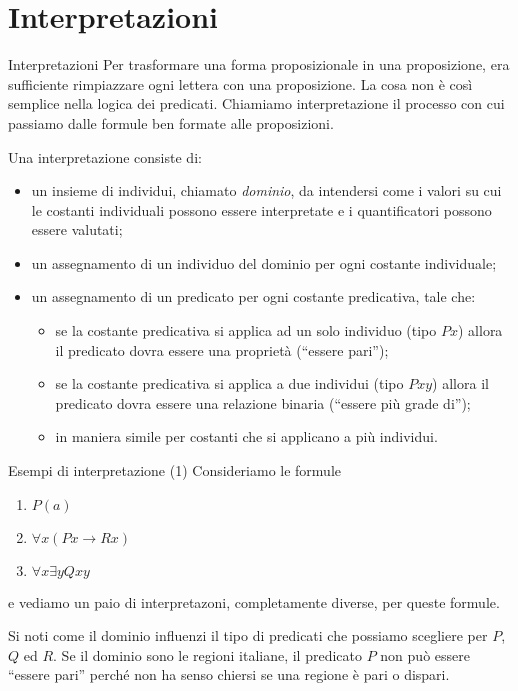 \documentclass[10pt,dvipsnames,xcolor=table,handout]{beamer}
\begin{document}
\section{Interpretazioni}

\begin{frame}{Interpretazioni}
    Per trasformare una forma proposizionale in una proposizione, era sufficiente rimpiazzare ogni lettera con una proposizione. La cosa non è così semplice nella logica dei predicati. Chiamiamo \alert{interpretazione} il processo con cui passiamo dalle formule ben formate alle proposizioni.

    \begin{definition}
        Una \alert{interpretazione} consiste di:
        \begin{itemize}
            \item un insieme di individui, chiamato \emph{dominio}, da intendersi come i valori su cui le costanti individuali possono essere interpretate e i quantificatori possono essere valutati;
            \item un assegnamento di un individuo del dominio per ogni costante individuale;
            \item un assegnamento di un predicato per ogni costante predicativa, tale che:
                  \begin{itemize}
                      \item se la costante predicativa si applica ad un solo individuo (tipo $Px$) allora il predicato dovra essere una proprietà (``essere pari'');
                      \item se la costante predicativa si applica a due individui (tipo $Pxy$) allora il predicato dovra essere una relazione binaria (``essere più grade di'');
                      \item in maniera simile per costanti che si applicano a più individui.
                  \end{itemize}
        \end{itemize}
    \end{definition}
\end{frame}

\begin{frame}{Esempi di interpretazione (1)}
    Consideriamo le formule
    \begin{enumerate}
        \item $P(a)$
        \item $\forall x (P x \to R x)$
        \item $\forall x \exists y Qxy$
    \end{enumerate}
    e vediamo un paio di interpretazoni, completamente diverse, per queste formule.

    \medskip
    Si noti come il dominio influenzi il tipo di predicati che possiamo scegliere per $P$, $Q$ ed $R$. Se il dominio sono le regioni italiane, il predicato $P$ non può essere ``essere pari'' perché non ha senso chiersi se una regione è pari o dispari.
\end{frame}
\end{document}
